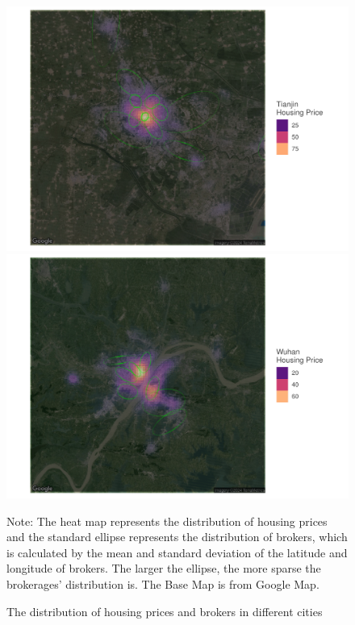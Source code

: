 \begin{figure}[h!]
\begin{minipage}{0.328\textwidth}
        \includegraphics[width=\linewidth]{figures/distribution_of_hp_and_broker/Tianjin.pdf}
    \end{minipage}

    \begin{minipage}{0.328\textwidth}
        \includegraphics[width=\linewidth]{figures/distribution_of_hp_and_broker/Wuhan.pdf}
    \end{minipage}
    \hfill

\caption{The distribution of housing prices and brokers in different cities}
\label{fig:distribution_of_housing_price_brokers_in_different_cities}

Note: The heat map represents the distribution of housing prices and the standard ellipse represents the distribution of brokers, which is calculated by the mean and standard deviation of the latitude and longitude of brokers. The larger the ellipse, the more sparse the brokerages' distribution is. The Base Map is from Google Map.
 \end{figure}
